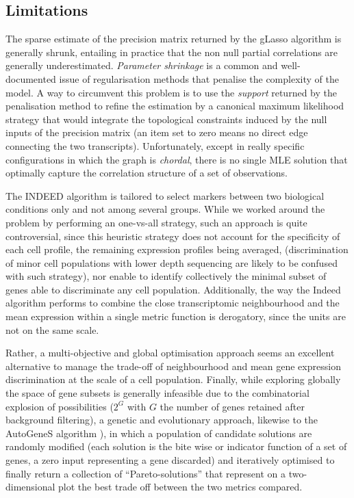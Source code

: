 \documentclass[long, final]{jobim}
\begin{document}
\subsection{Limitations}
\label{subsec:limitations}

The sparse estimate of the precision matrix returned by the gLasso \cite{mazumder_hastie11} algorithm is generally shrunk, entailing in practice that the non null partial correlations are generally underestimated. \textit{Parameter shrinkage} is a common and well-documented issue of regularisation methods that penalise the complexity of the model. A way to circumvent this problem is to use the \textit{support} returned by the penalisation method to refine the estimation by a canonical maximum likelihood strategy that would integrate the topological constraints induced by the null inputs of the precision matrix (an item set to zero means no direct edge connecting the two transcripts). Unfortunately, except in really specific configurations in which the graph is \textit{chordal}, there is no single MLE solution that optimally capture the correlation structure of a set of observations.



The INDEED algorithm \cite{zuo_etal16} is tailored to select markers between two biological conditions only and not among several groups. While we worked around the problem by performing an one-vs-all strategy, such an approach is quite controversial, since this heuristic strategy does not account for the specificity of each cell profile, the remaining expression profiles being averaged, (discrimination of minor cell populations with lower depth sequencing are likely to be confused with such strategy), nor enable to identify collectively the minimal subset of genes able to discriminate any cell population. Additionally, the way the Indeed algorithm performs to combine the close transcriptomic neighbourhood and the mean expression within a single metric function is derogatory, since the units are not on the same scale.

Rather, a multi-objective and global optimisation approach seems an excellent alternative to manage the trade-off of neighbourhood and mean gene expression discrimination at the scale of a cell population. Finally, while exploring globally the space of gene subsets is generally infeasible due to the combinatorial explosion of possibilities ($2^G$ with $G$ the number of genes retained after background filtering), a genetic and evolutionary approach, likewise to the AutoGeneS algorithm \cite{aliee_theis21}), in which a population of candidate solutions are randomly modified (each solution is the bite wise or indicator function of a set of genes, a zero input representing a gene discarded) and iteratively optimised to finally return a collection of \enquote{Pareto-solutions} that represent on a two-dimensional plot the best trade off between the two metrics compared.
\end{document}
